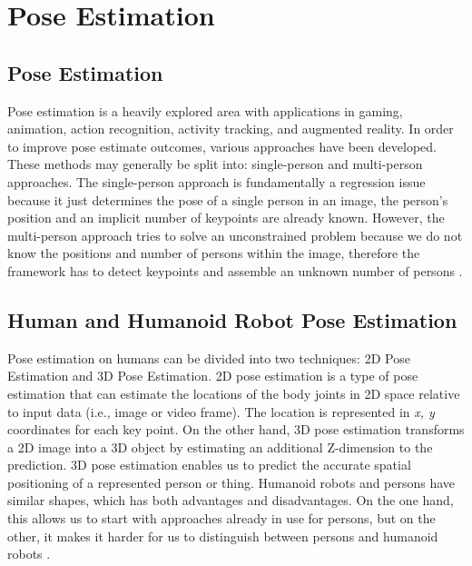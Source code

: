 \section{Pose Estimation}
\label{sec:poseestimation}


\subsection{Pose Estimation}
\label{subsec:poseestimation}

Pose estimation is a heavily explored area with applications in gaming, animation, action recognition, activity tracking, and augmented reality.
In order to improve pose estimate outcomes, various approaches have been developed. These methods may generally be split into: single-person and multi-person approaches.
The single-person approach is fundamentally a regression issue because it just determines the pose of a single person in an image, 
the person's position and an implicit number of keypoints are already known. However, the multi-person approach tries to solve an unconstrained problem because we do not know 
the positions and number of persons within the image, therefore the framework has to detect keypoints and assemble an unknown number of persons \citep{romeo}.

\subsection{Human and Humanoid Robot Pose Estimation}
\label{subsec:uhmanandrobotposeestimation}

Pose estimation on humans can be divided into two techniques: 2D Pose Estimation and 3D Pose Estimation.
2D pose estimation is a type of pose estimation that can estimate the locations of the body joints in 2D space relative to input data (i.e., image or video frame). 
The location is represented in \emph{x, y} coordinates for each key point. On the other hand, 3D pose estimation transforms a 2D image into a 3D object by estimating an additional Z-dimension to the prediction.
3D pose estimation enables us to predict the accurate spatial positioning of a represented person or thing.
Humanoid robots and persons have similar shapes, which has both advantages and disadvantages. On the one hand, this allows us to start with approaches already in use for persons,
but on the other, it makes it harder for us to distinguish between persons and humanoid robots \citep{amini2021}.